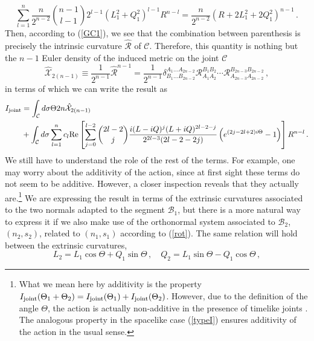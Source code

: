 \documentclass[11pt,letterpaper]{article}
\begin{document}
\begin{equation}
\sum_{l=1}^{n}\frac{n}{2^{n-2}}\binom{n-1}{l-1}2^{l-1}\left(L_1^2+Q_1^2\right)^{l-1}R^{n-l}=\frac{n}{2^{n-2}}\left(R+2L_1^2+2 Q_1^2\right)^{n-1}\, .
\end{equation}
 Then, according to (\ref{GC1}), we see that the combination between parenthesis is precisely the intrinsic curvature $\hat{\mathcal{R}}$ of $\mathcal{C}$. Therefore, this quantity is nothing but the $n-1$ Euler density of the induced metric on the joint $\mathcal{C}$
\begin{equation}
\hat{\mathcal{X}}_{2(n-1)}\equiv\frac{1}{2^{n-1}}\hat{\mathcal{R}}^{n-1}=\frac{1}{2^{n-1}}\delta^{A_1 \dots A_{2n-2}}_{B_1\dots B_{2n-2}}\mathcal{R}^{B_1B_2}_{A_1A_2}\cdots \mathcal{R}^{B_{2n-3}B_{2n-2}}_{A_{2n-3}A_{2n-2}}\, ,
\end{equation}
in terms of which we can write the result as
\begin{equation}
\begin{aligned}
I_{\rm joint}&=\int_{\mathcal{C}}d\sigma \Theta 2n\hat{\mathcal{X}}_{2(n-1)} \\
&+\int_{\mathcal{C}}d\sigma \sum_{l=1}^{n}c_l{\rm Re}\left[\sum_{j=0}^{l-2}\binom{2l-2}{j}\frac{i(L-iQ)^j(L+iQ)^{2l-2-j}}{2^{2l-3}(2l-2-2j)}\left(e^{(2j-2l+2)i\Theta}-1\right)\right]R^{n-l}\, .
\end{aligned}
\end{equation}
We still have to understand the role of the rest of the terms. For example, one may worry about the additivity of the action, since at first sight these terms do not seem to be additive. However, a closer inspection reveals that they actually are.\footnote{What we mean here by additivity is the property $I_{\rm joint}(\Theta_1+\Theta_2)=I_{\rm joint}(\Theta_1)+I_{\rm joint}(\Theta_2)$. However, due to the definition of the angle $\Theta$, the action is actually non-additive in the presence of timelike joints \cite{PhysRevD.50.4914}. The analogous property in the spacelike case (\ref{typeI}) ensures additivity of the action in the usual sense.}  We are expressing the result in terms of the extrinsic curvatures associated to the two normals adapted to the segment $\mathcal{B}_1$, but there is a more natural way to express it if we also make use of the orthonormal system associated to $\mathcal{B}_2$, $(n_2, s_2)$, related to $(n_1, s_1)$ according to (\ref{rot}).
The same relation will hold between the extrinsic curvatures,
\begin{equation}
L_2=L_1 \cos\Theta+Q_1\sin\Theta\, ,\quad Q_2=L_1 \sin \Theta-Q_1 \cos\Theta\, ,
\end{equation}
\end{document}
